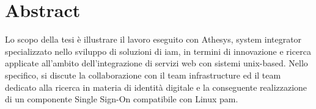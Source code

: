 
\cleardoublepage
{}
{}
\begingroup
\let\clearpage\relax
\let\cleardoublepage\relax
\let\cleardoublepage\relax

\chapter*{Abstract}

Lo scopo della tesi è illustrare il lavoro eseguito con Athesys, system integrator specializzato nello sviluppo di soluzioni di \acrfull{iam}, in termini di innovazione e ricerca applicate all'ambito dell'integrazione di servizi web con sistemi unix-based. Nello specifico, si discute la collaborazione con il team infrastructure ed il team dedicato alla ricerca in materia di identità digitale e la conseguente realizzazione di un componente Single Sign-On compatibile con Linux \acrfull{pam}. ​

%
%

\endgroup			

\vfill

